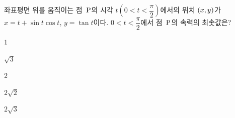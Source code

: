 좌표평면 위를 움직이는 점~$\mathrm{P}$의 시각 $t\left(0<t<\dfrac{\pi}{2}\right)$에서의 위치 $(x{,}\mkern3mu\mathopen{}y)$가 $x=t+\sin t\cos t$, $y=\tan t$이다. $0<t<\dfrac{\pi}{2}$에서 점~$\mathrm{P}$의 속력의 최솟값은?
\begin{choices32}{\rule[-3ex]{0pt}{8ex}$1$}{\rule[-3ex]{0pt}{8ex}$\sqrt{3}$}{\rule[-3ex]{0pt}{8ex}$2$}{\rule[-3ex]{0pt}{8ex}$2\sqrt{2}$}{\rule[-3ex]{0pt}{8ex}$2\sqrt{3}$}\end{choices32}
